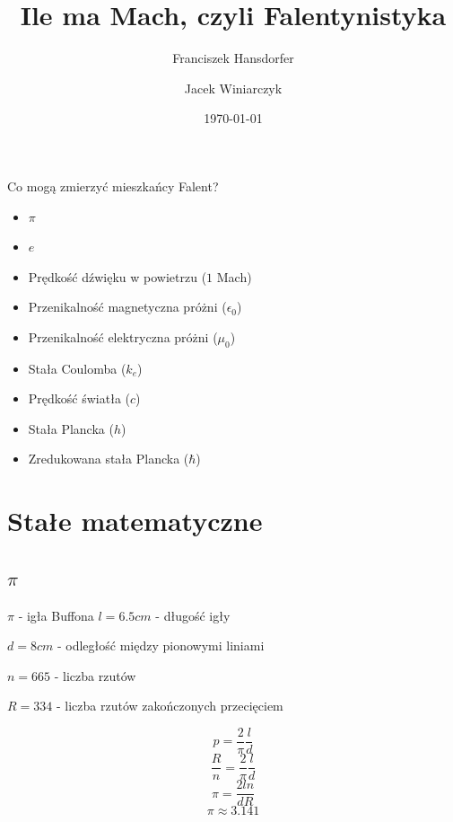\documentclass{beamer}
\title{Ile ma Mach, czyli Falentynistyka}
\author{Franciszek Hansdorfer \and Jacek Winiarczyk}
\institute{Wydział fizyki doświadczalnej KFnrD}
\date{\today}
\begin{document}
\begin{frame}
	\titlepage
\end{frame}

\begin{frame}{Co mogą zmierzyć mieszkańcy Falent?}
	\begin{itemize}
		\item $\pi$
		\item $e$
		\item Prędkość dźwięku w powietrzu ($1$ Mach)
		\item Przenikalność magnetyczna próżni ($\epsilon_0$)
		\item Przenikalność elektryczna próżni ($\mu_0$)
		\item Stała Coulomba ($k_e$)
		\item Prędkość światła ($c$)
		\item Stała Plancka ($h$)
		\item Zredukowana stała Plancka ($\hbar$)
	\end{itemize}

\end{frame}

\section{Stałe matematyczne}

\subsection{$\pi$}

\begin{frame}{$\pi$ - igła Buffona}
	$l=6.5cm$ - długość igły

	$d=8cm$ - odległość między pionowymi liniami

	$n=665$ - liczba rzutów

	$R=334$ - liczba rzutów zakończonych przecięciem

	$$p = \frac{2}{\pi} \frac{l}{d}$$
	$$\frac{R}{n} = \frac{2}{\pi}\frac{l}{d}$$
	$$\pi = \frac{2 l n}{d R}$$
	$$\pi \approx 3.141$$

\end{frame}


\end{document}
